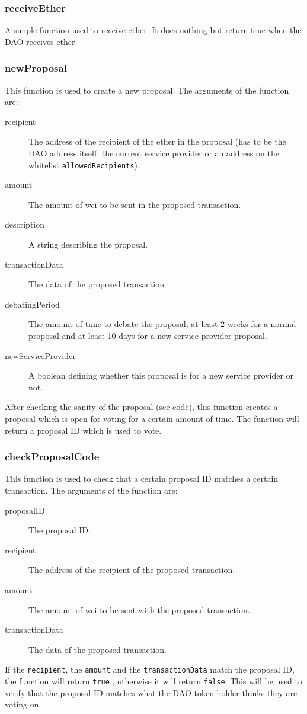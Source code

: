 \documentclass[9pt,oneside]{amsart}
\begin{document}
\begin{multicols}{2}
\subsubsection*{receiveEther}
A simple function used to receive ether. It does nothing but return true when the DAO receives ether.

\subsubsection*{newProposal}
This function is used to create a new proposal. The arguments of the function are:
\begin{description}
 \item[recipient] The address of the recipient of the ether in the proposal (has to be the DAO address itself, the current service provider or an address on the whitelist \verb|allowedRecipients|).
 \item[amount] The amount of wei to be sent in the proposed transaction.
 \item[description] A string describing the proposal.
 \item[transactionData] The data of the proposed transaction.
 \item[debatingPeriod] The amount of time to debate the proposal, at least 2 weeks for a normal proposal and at least 10 days for a new service provider proposal.
 \item[newServiceProvider] A boolean defining whether this proposal is for a new service provider or not.
\end{description}
After checking the sanity of the proposal (see code), this function creates a proposal which is open for voting for a certain amount of time. The function will return a proposal ID which is used to vote.

\subsubsection*{checkProposalCode}
This function is used to check that a certain proposal ID matches a certain transaction.
The arguments of the function are:
\begin{description}
 \item[proposalID] The proposal ID.
 \item[recipient] The address of the recipient of the proposed transaction.
 \item[amount] The amount of wei to be sent with the proposed transaction.
 \item[transactionData] The data of the proposed transaction.
\end{description}
If the \verb|recipient|,  the \verb|amount| and the \verb|transactionData| match the proposal ID, the function will return \verb|true| , otherwise it will return \verb|false|. This will be used to verify that the proposal ID matches what the DAO token holder thinks they are voting on.


\end{multicols}
\end{document}
